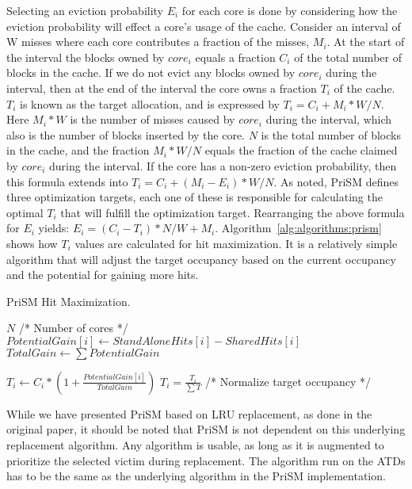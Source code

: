 Selecting an eviction probability $E_i$ for each core is done by considering how the eviction probability will effect a core's usage of the cache.
Consider an interval of W misses where each core contributes a fraction of the misses, $M_i$.
At the start of the interval the blocks owned by $core_i$ equals a fraction $C_i$ of the total number of blocks in the cache.
If we do not evict any blocks owned by $core_i$ during the interval, then at the end of the interval the core owns a fraction $T_i$ of the cache.
$T_i$ is known as the target allocation, and is expressed by $T_i = C_i + M_i * W/N$. 
Here $M_i * W$ is the number of misses caused by $core_i$ during the interval, which also is the number of blocks inserted by the core.
$N$ is the total number of blocks in the cache, and the fraction $M_i * W/N$ equals the fraction of the cache claimed by $core_i$ during the interval.
If the core has a non-zero eviction probability, then this formula extends into $T_i = C_i + (M_i - E_i) * W/N$.
As noted, PriSM defines three optimization targets, each one of these is responsible for calculating the optimal $T_i$ that will fulfill the optimization target.
Rearranging the above formula for $E_i$ yields: $E_i = (C_i - T_i) * N/W + M_i$.
Algorithm~\ref{alg:algorithms:prism} shows how $T_i$ values are calculated for hit maximization.
It is a relatively simple algorithm that will adjust the target occupancy based on the current occupancy and the potential for gaining more hits.

\begin{algorithm}[ht]
\caption{PriSM Hit Maximization.}
\label{alg:algorithms:prism}
\begin{algorithmic}[1]
\State $N$ /* Number of cores */
    \State $PotentialGain[i]\gets StandAloneHits[i] - SharedHits[i]$
\EndFor
\State $TotalGain\gets \sum{PotentialGain}$

    \State $T_i\gets C_i * (1 + \frac{PotentialGain[i]}{TotalGain})$
\EndFor
\State $T_i = \frac{T_i}{\sum{T}}$ /* Normalize target occupancy */
\end{algorithmic}
\end{algorithm}

While we have presented PriSM based on LRU replacement, as done in the original paper, it should be noted that PriSM is not dependent on this underlying replacement algorithm.
Any algorithm is usable, as long as it is augmented to prioritize the selected victim during replacement.
The algorithm run on the ATDs has to be the same as the underlying algorithm in the PriSM implementation.